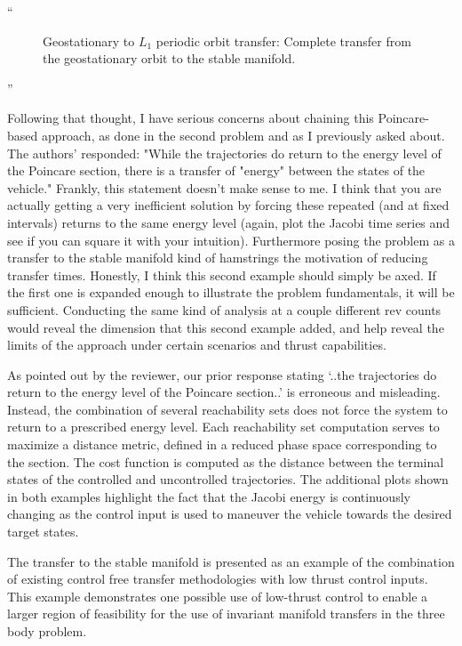 \documentclass[11pt]{article}
\newenvironment{correction}{\begin{list}{}{\setlength{\leftmargin}{1cm}\setlength{\rightmargin}{1cm}}\vspace{\parsep}\item[]``}{''\end{list}}
\begin{document}
\begin{itemize}
\begin{correction}
\begin{figure}
        \caption{Geostationary to \( L_1 \) periodic orbit transfer: Complete transfer from the geostationary orbit to the stable manifold.\label{fig:geo_transfer}}
\end{figure}
        \end{correction}
    \item 
        \begin{itshape}
            Following that thought, I have serious concerns about chaining this Poincare-based approach, as done in the second problem and as I previously asked about.  The authors' responded: "While the trajectories do return to the energy level of the Poincare section, there is a transfer of "energy" between the states of the vehicle." Frankly, this statement doesn't make sense to me.  I think that you are actually getting a very inefficient solution by forcing these repeated (and at fixed intervals) returns to the same energy level (again, plot the Jacobi time series and see if you can square it with your intuition).  Furthermore posing the problem as a transfer to the stable manifold kind of hamstrings the motivation of reducing transfer times.  Honestly, I think this second example should simply be axed.  If the first one is expanded enough to illustrate the problem fundamentals, it will be sufficient.  Conducting the same kind of analysis at a couple different rev counts would
            reveal the dimension that this second example added, and help reveal the limits of the approach under certain scenarios and thrust capabilities.
        \end{itshape}

		As pointed out by the reviewer, our prior response stating `..the trajectories do return to the energy level of the Poincare section..' is erroneous and misleading. 
        Instead, the combination of several reachability sets does not force the system to return to a prescribed energy level.
        Each reachability set computation serves to maximize a distance metric, defined in a reduced phase space corresponding to the \Poincare section.
        The cost function is computed as the distance between the terminal states of the controlled and uncontrolled trajectories.
        The additional plots shown in both examples highlight the fact that the Jacobi energy is continuously changing as the control input is used to maneuver the vehicle towards the desired target states.

        The transfer to the stable manifold is presented as an example of the combination of existing control free  transfer methodologies with low thrust control inputs.
        This example demonstrates one possible use of low-thrust control to enable a larger region of feasibility for the use of invariant manifold transfers in the three body problem. 


\end{itemize}
\end{document}
